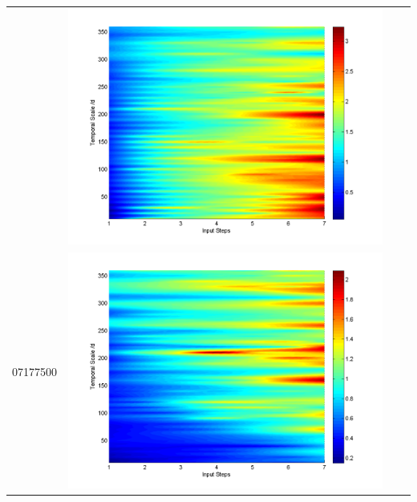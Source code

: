 \documentclass[11pt]{article}
\begin{document}
\begin{table}[H]
{\begin{tabular}{cccc}
&\begin{minipage}{.3\textwidth}\includegraphics[width=\linewidth]{resultgraph/07019000pepq.png}\end{minipage} 
\\
07177500&\begin{minipage}{.3\textwidth}\includegraphics[width=\linewidth]{resultgraph/07177500p.png}\end{minipage}

\end{tabular}}
\end{table}
\end{document}

